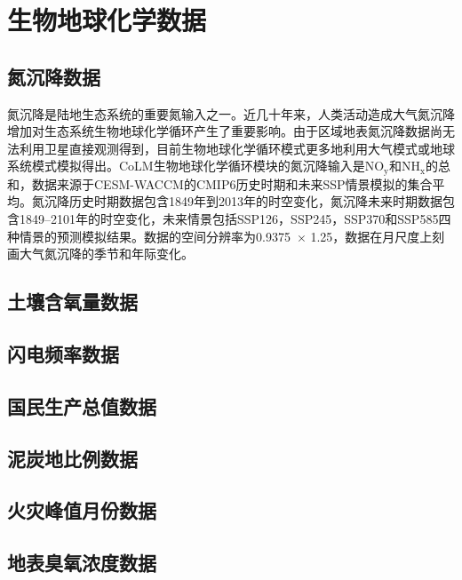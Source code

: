 \section{生物地球化学数据}


\subsection{氮沉降数据}\label{氮沉降数据}
氮沉降是陆地生态系统的重要氮输入之一。近几十年来，人类活动造成大气氮沉降增加对生态系统生物地球化学循环产生了重要影响。由于区域地表氮沉降数据尚无法利用卫星直接观测得到，目前生物地球化学循环模式更多地利用大气模式或地球系统模式模拟得出。CoLM生物地球化学循环模块的氮沉降输入是$\mathrm{NO_y}$和$\mathrm{NH_x}$的总和，数据来源于CESM-WACCM的CMIP6历史时期和未来SSP情景模拟的集合平均。氮沉降历史时期数据包含1849年到2013年的时空变化，氮沉降未来时期数据包含1849--2101年的时空变化，未来情景包括SSP126，SSP245，SSP370和SSP585四种情景的预测模拟结果。数据的空间分辨率为0.9375\textdegree\ $\times$ 1.25\textdegree，数据在月尺度上刻画大气氮沉降的季节和年际变化。


\subsection{土壤含氧量数据}\label{土壤含氧量数据}



\subsection{闪电频率数据}\label{闪电频率数据}



\subsection{国民生产总值数据}\label{国民生产总值数据}



\subsection{泥炭地比例数据}\label{泥炭地比例数据}



\subsection{火灾峰值月份数据}\label{火灾峰值月份数据}



\subsection{地表臭氧浓度数据}\label{地表臭氧浓度数据}



